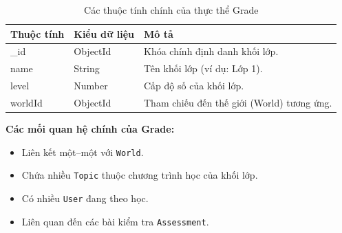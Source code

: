 \begin{table}[H]
	\centering
	\begin{tabularx}{\textwidth}{|l|l|X|}
		\hline
		\textbf{Thuộc tính} & \textbf{Kiểu dữ liệu} & \textbf{Mô tả} \\ \hline
		\_id & ObjectId & Khóa chính định danh khối lớp. \\ \hline
		name & String & Tên khối lớp (ví dụ: Lớp 1). \\ \hline
		level & Number & Cấp độ số của khối lớp. \\ \hline
		worldId & ObjectId & Tham chiếu đến thế giới (World) tương ứng. \\ \hline
	\end{tabularx}
	\caption{Các thuộc tính chính của thực thể Grade}
\end{table}

\newline
\textbf{Các mối quan hệ chính của Grade:}
\begin{itemize}
	\item Liên kết một--một với \texttt{World}.
	\item Chứa nhiều \texttt{Topic} thuộc chương trình học của khối lớp.
	\item Có nhiều \texttt{User} đang theo học.
	\item Liên quan đến các bài kiểm tra \texttt{Assessment}.
\end{itemize}

